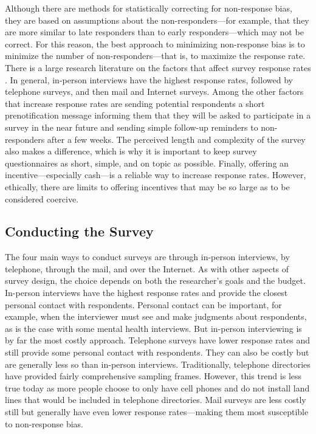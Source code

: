 Although there are methods for statistically correcting for non-response bias, they are based on assumptions about the non-responders---for example, that they are more similar to late responders than to early responders---which may not be correct. For this reason, the best approach to minimizing non-response bias is to minimize the number of non-responders---that is, to maximize the response rate. There is a large research literature on the factors that affect survey response rates \citep{groves_survey_2011}. In general, in-person interviews have the highest response rates, followed by telephone surveys, and then mail and Internet surveys. Among the other factors that increase response rates are sending potential respondents a short prenotification message informing them that they will be asked to participate in a survey in the near future and sending simple follow-up reminders to non- responders after a few weeks. The perceived length and complexity of the survey also makes a difference, which is why it is important to keep survey questionnaires as short, simple, and on topic as possible. Finally, offering an incentive---especially cash---is a reliable way to increase response rates. However, ethically, there are limits to offering incentives that may be so large as to be considered coercive.

\subsection{Conducting the Survey}


The four main ways to conduct surveys are through in-person interviews, by telephone, through the mail, and over the Internet. As with other aspects of survey design, the choice depends on both the researcher’s goals and the budget. In-person interviews have the highest response rates and provide the closest personal contact with respondents. Personal contact can be important, for example, when the interviewer must see and make judgments about respondents, as is the case with some mental health interviews. But in-person interviewing is by far the most costly approach. Telephone surveys have lower response rates and still provide some personal contact with respondents. They can also be costly but are generally less so than in-person interviews. Traditionally, telephone directories have provided fairly comprehensive sampling frames. However, this trend is less true today as more people choose to only have cell phones and do not install land lines that would be included in telephone
directories. Mail surveys are less costly still but generally have even lower response rates---making them most susceptible to non-response bias.


